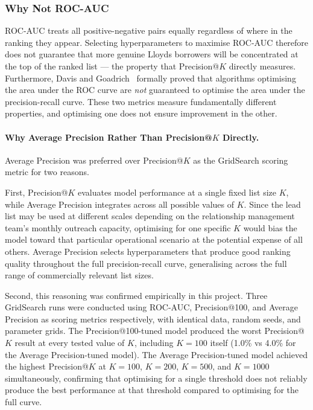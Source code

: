 \documentclass[ %
                    author={Natchalin Iwsakul \\ Inkaphol Siriwongwattana \\ Tanaphan Kummaraphat \\ Patorn Srisupap},
                supervisor={Fernando Moreno-Pino},
                    degree={MSc},
                     title={Propensity Modelling for SME Commercial Lending Using Open Public Data},
                  subtitle={Companies House filings and GDELT media coverage as predictors of first-time borrowing},
                      type={},
                      year={2026}]{dissertation}
\begin{document}
\subsubsection{Why Not ROC-AUC}

ROC-AUC treats all positive-negative pairs equally
regardless of where in the ranking they appear.
Selecting hyperparameters to maximise ROC-AUC therefore
does not guarantee that more genuine Lloyds borrowers will
be concentrated at the top of the ranked list --- the
property that Precision@$K$ directly measures.
Furthermore, Davis and Goadrich~\cite{davis2006} formally
proved that algorithms optimising the area under the ROC
curve are \emph{not} guaranteed to optimise the area under
the precision-recall curve. These two metrics measure
fundamentally different properties, and optimising one
does not ensure improvement in the other.

\paragraph{Why Average Precision Rather Than
           Precision@$K$ Directly.}

Average Precision was preferred over Precision@$K$
as the GridSearch scoring metric for two reasons.

First, Precision@$K$ evaluates model performance
at a single fixed list size $K$, while Average
Precision integrates across all possible values of
$K$. Since the lead list may be used
at different scales depending on the relationship
management team's monthly outreach capacity,
optimising for one specific $K$ would bias the model
toward that particular operational scenario at the
potential expense of all others. Average Precision
selects hyperparameters that produce good ranking
quality throughout the full precision-recall curve,
generalising across the full range of commercially
relevant list sizes.

Second, this reasoning was confirmed empirically
in this project. Three GridSearch runs were conducted
using ROC-AUC, Precision@100, and Average Precision
as scoring metrics respectively, with identical data,
random seeds, and parameter grids. The
Precision@100-tuned model produced the worst
Precision@$K$ result at every tested value of $K$,
including $K=100$ itself (1.0\% vs 4.0\% for the
Average Precision-tuned model). The Average
Precision-tuned model achieved the highest
Precision@$K$ at $K=100$, $K=200$, $K=500$,
and $K=1000$ simultaneously, confirming that
optimising for a single threshold does not reliably
produce the best performance at that threshold
compared to optimising for the full curve.
\end{document}
